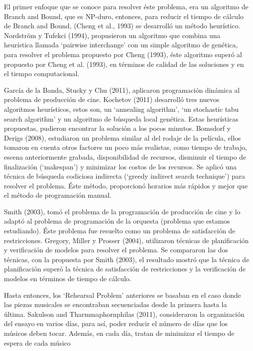 \documentclass[journal, 10pt]{IEEEtran}
\begin{document}
El primer enfoque que se conoce para resolver éste problema, era un algoritmo de Branch and Bound, que es NP-duro, entonces, para reducir el tiempo de cálculo de Branch and Bound, (Cheng et al., 1993) se desarrolló un método heurístico\cite{ref1}. Nordström y Tufekci (1994)\cite{ref2}, propusieron un algoritmo que combina una heurística llamada `pairwise interchange' con un simple algoritmo de genética, para resolver el problema propuesto por Cheng (1993)\cite{ref1}, éste algoritmo superó al propuesto por Cheng et al. (1993)\cite{ref1}, en términos de calidad de las soluciones y en el tiempo computacional.

García de la Banda, Stucky y Chu (2011)\cite{ref3}, aplicaron programación dinámica al problema de producción de cine. Kochetov (2011)\cite{ref4} desarrolló tres nuevos algoritmos heurísticos, estos son, un `annealing algorithm', `un stochastic tabu search algorithm' y un algoritmo de búsqueda local genética. Estas heurísticas propuestas, pudieron encontrar la solución a los pocos minutos. Bomsdorf y Derigs (2008)\cite{ref5}, estudiaron un problema similar al del rodaje de la película, ellos tomaron en cuenta otros factores un poco más realistas, como tiempo de trabajo, escena anteriormente grabada, disponibilidad de recursos, disminuir el tiempo de finalización (`makespan') y minimizar los costos de los recursos. Se aplicó una técnica de búsqueda codiciosa indirecta (`greedy indirect search technique') para resolver el problema. Éste método, proporcionó horarios más rápidos y mejor que el método de programación manual.

Smith (2003)\cite{ref6}, tomó el problema de la programación de producción de cine y lo adaptó al problema de programación de la orquesta (problema que estamos estudiando). Éste problema fue resuelto como un problema de satisfacción de restricciones. Gregory, Miller y Prosser (2004)\cite{ref7}, utilizaron técnicas de planificación y verificación de modelos para resolver el problema. Se compararon las dos técnicas, con la propuesta por Smith (2003)\cite{ref6}, el resultado mostró que la técnica de planificación superó la técnica de satisfacción de restricciones y la verificación de modelos en términos de tiempo de cálculo.

Hasta entonces, los `Rehearsal Problem' anteriores se basaban en el caso donde las piezas musicales se encontraban secuenciadas desde la primera hasta la última. Sakulson and Tharmmaphornphilas (2011)\cite{ref8}, consideraron la organización del ensayo en varios días, para así, poder reducir el número de días que los músicos deben tocar. Además, en cada día, tratan de minimizar el tiempo de espera de cada músico
\end{document}
